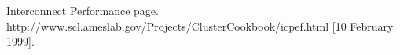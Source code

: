 \documentclass{cpeauth}
\begin{document}
\begin{thebibliography}{99}
Interconnect Performance page.           %
\\    %
http://www.scl.ameslab.gov/Projects/ClusterCookbook/icpef.html        %
[10 February 1999].                      %

\end{thebibliography}
\end{document}
